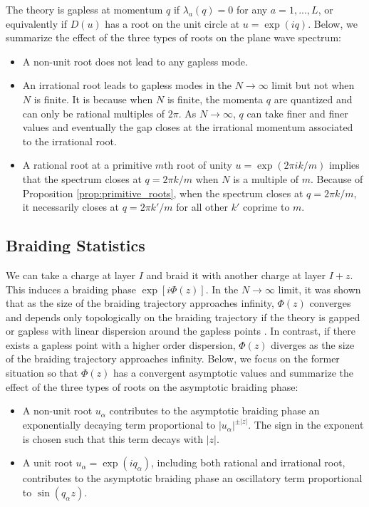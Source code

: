 \documentclass[aps,prb,twocolumn,superscriptaddress,floatfix,10pt,nofootinbib]{revtex4-2}
\theoremstyle{definition}
\begin{document}
The theory is gapless at momentum $q$ if $\lambda_a(q)=0$ for any $a=1,...,L$, or equivalently if $D(u)$ has a root on the unit circle at $u=\exp({iq})$. Below, we summarize the effect of the three types of roots on the plane wave spectrum:
\begin{itemize}[leftmargin=*]
    \item 
    A non-unit root does not lead to any gapless mode.
    \item
    An irrational root leads to gapless modes in the $N\to\infty$ limit but not when $N$ is finite. It is because when $N$ is finite, the momenta $q$ are quantized and can only be rational multiples of $2\pi$. As $N\to\infty$, $q$ can take finer and finer values and eventually the gap closes at the irrational momentum associated to the irrational root.
    \item 
    A rational root at a primitive $m$th root of unity $u=\exp(2\pi ik/m)$ implies that the spectrum closes at $q=2\pi k/m$ when $N$ is a multiple of $m$. Because of Proposition \ref{prop:primitive_roots}, when the spectrum closes at $q=2\pi k/m$, it necessarily closes at $q={2\pi k'}/{m}$ for all other $k'$ coprime to $m$.
\end{itemize}


\subsection{Braiding Statistics}

We can take a charge at layer $I$ and braid it with another charge at layer $I+z$. This induces a braiding phase $\exp[i\Phi(z)]$. In the $N\to\infty$ limit, it was shown that as the size of the braiding trajectory approaches infinity, $\Phi(z)$ converges and depends only topologically on the braiding trajectory if the theory is gapped or gapless with linear dispersion around the gapless points \cite{Chen:2022hbz}. In contrast, if there exists a gapless point with a higher order dispersion, $\Phi(z)$ diverges as the size of the braiding trajectory approaches infinity. Below, we focus on the former situation so that $\Phi(z)$ has a convergent asymptotic values and summarize the effect of the three types of roots on the asymptotic braiding phase:
\begin{itemize}[leftmargin=*]
    \item 
    A non-unit root $u_\alpha$ contributes to the asymptotic braiding phase an exponentially decaying term proportional to $|u_\alpha|^{\pm |z|}$. The sign in the exponent is chosen such that this term decays with $|z|$.
    \item 
    A unit root $u_\alpha=\exp(iq_\alpha)$, including both rational and irrational root, contributes to the asymptotic braiding phase an oscillatory term proportional to $\sin(q_\alpha z)$.
\end{itemize}
\end{document}
